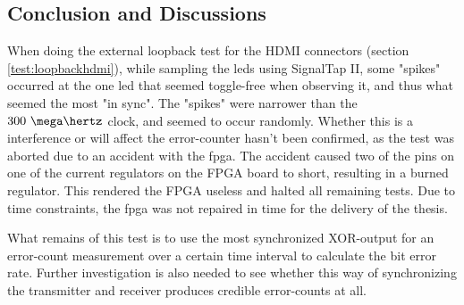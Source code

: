 \documentclass[main.tex]{subfiles}
\begin{document}


\subsection{Conclusion and Discussions}

When doing the external loopback test for the HDMI connectors (section \ref{test:loopbackhdmi}), while sampling the \glspl{led} using SignalTap II, some "spikes" occurred at the one \gls{led} that seemed toggle-free when observing it, and thus what seemed the most "in sync". The "spikes" were narrower than the $300~\mega\hertz$ clock, and seemed to occur randomly. Whether this is a interference or will affect the error-counter hasn't been confirmed, as the test was aborted due to an accident with the \gls{fpga}. The accident caused two of the pins on one of the current regulators on the FPGA board to short, resulting in a burned regulator. This rendered the FPGA useless and halted all remaining tests. Due to time constraints, the \gls{fpga} was not repaired in time for the delivery of the thesis.

What remains of this test is to use the most synchronized XOR-output for an error-count measurement over a certain time interval to calculate the bit error rate. Further investigation is also needed to see whether this way of synchronizing the transmitter and receiver produces credible error-counts at all.\\
\end{document}
